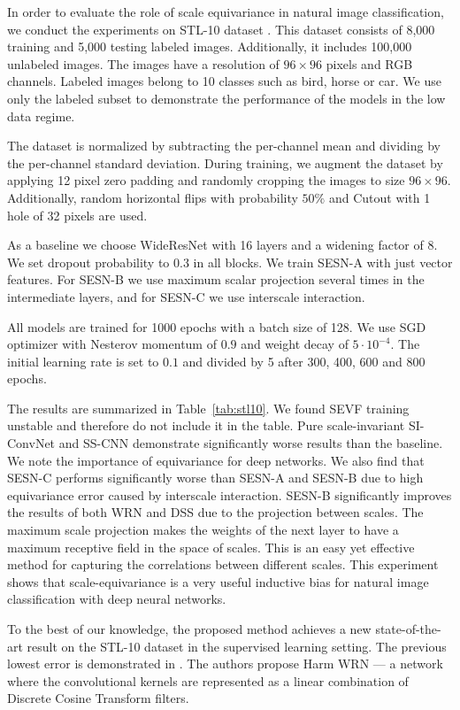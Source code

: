\documentclass{article} \usepackage{multirow}
\def\Tabref#1{Table~\ref{#1}}
\begin{document}
In order to evaluate the role of scale equivariance in natural image classification, we
conduct the experiments on STL-10 dataset \citet{coates2011analysis}. 
This dataset consists of 8,000 training and 5,000 testing labeled images. Additionally, it includes 100,000 unlabeled images. The images have a resolution of $96\times96$ pixels and RGB channels.
Labeled images belong to 10 classes such as bird, horse or car.
We use only the labeled subset to demonstrate the performance of the models in the low data regime. 

The dataset is normalized by subtracting the per-channel mean and dividing 
by the per-channel standard deviation.
During training, we augment the dataset by applying 12 pixel zero padding 
and randomly cropping the images to size $96\times96$. Additionally, random horizontal flips with probability $50\%$ 
and Cutout \citet{devries2017improved} with 1 hole of 32 pixels are used.

As a baseline we choose WideResNet \citet{zagoruyko2016wide} with 16 layers and a widening factor of 8.
We set dropout probability to $0.3$ in all blocks. We train SESN-A with just vector features. 
For SESN-B we use maximum scalar projection several times in the intermediate layers, 
and for SESN-C we use interscale interaction. 

All models are trained for 1000 epochs with a batch size of 128. We use SGD optimizer
with Nesterov momentum of $0.9$ and weight decay of $5\cdot10^{-4}$. The initial learning rate is set to $0.1$
and divided by 5 after 300, 400, 600 and 800 epochs. 

The results are summarized in \Tabref{tab:stl10}. We found SEVF training unstable and therefore do not include it in the table.
Pure scale-invariant SI-ConvNet and SS-CNN demonstrate significantly worse results than the baseline. 
We note the importance of equivariance for deep networks.
We also find that SESN-C performs significantly worse than SESN-A and SESN-B due to high equivariance error
caused by interscale interaction. SESN-B significantly improves the results of both WRN and DSS due to the projection between scales. 
The maximum scale projection makes the weights of the next layer to have a maximum receptive field in the space of scales. This is an easy yet effective method for capturing the correlations between different scales.
This experiment shows that scale-equivariance is a very useful inductive bias for natural 
image classification with deep neural networks.

To the best of our knowledge, the proposed method achieves a new state-of-the-art result on the STL-10 dataset in the 
supervised learning setting. The previous lowest error is demonstrated in \citet{ulicny2019harmonic}. 
The authors propose Harm WRN --- a network where the convolutional kernels are represented as a linear combination of 
Discrete Cosine Transform filters.
\end{document}
